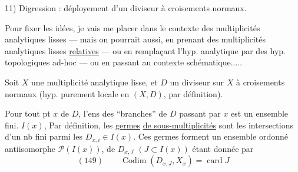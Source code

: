 11) Digression : déployement d'un diviseur à croisements normaux.

Pour fixer les idées, je vais me placer dans le contexte des multiplicités analytiques lisses — mais on pourrait aussi, en prenant des multiplicités analytiques lisses \uline{relatives} — ou en remplaçant l'hyp. analytique par des hyp. topologiques ad-hoc — ou en passant au contexte schématique.....

Soit $X$ une multiplicité analytique lisse, et $D$ un diviseur sur $X$ à croisements normaux (hyp. purement locale en $(X,D)$, par définition). 

Pour tout pt $x$ de $D$, l'ens des ``branches'' de $D$ passant par $x$ est un ensemble fini. $I(x)$, Par définition, les \uline{germes}  \uline{de sous-multiplicités}   sont les intersections d'un nb fini  parmi les $D_{x,i}\in I(x)$.
Ces germes forment un ensemble ordonné  antiisomorphe  $\mathcal P(I(x))$,   de $D_{x,J}$ $(J\subset I(x))$ étant donnée par
\[
(149)\qquad \operatorname{Codim}(D_{x,J},X_x)=\operatorname{card}J
\]
